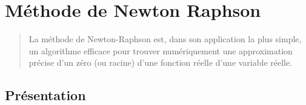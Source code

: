 \chapter{Méthode de Newton Raphson}\label{Ch_NewRaph}
\begin{abstract}
La méthode de Newton-Raphson est, dans son application la plus simple, un algorithme efficace pour trouver numériquement une approximation précise d'un zéro (ou racine) d'une fonction réelle d'une variable réelle. 
\end{abstract}

\medskip
\section{Présentation}

